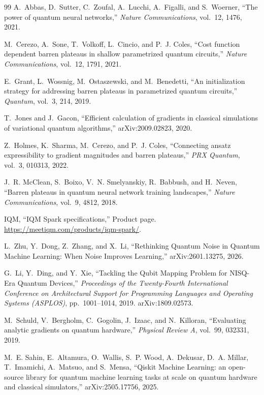 \documentclass[11pt]{article}
\begin{document}
\begin{thebibliography}{99}
A.~Abbas, D.~Sutter, C.~Zoufal, A.~Lucchi, A.~Figalli, and S.~Woerner,
\newblock ``The power of quantum neural networks,''
\newblock \emph{Nature Communications}, vol.~12, 1476, 2021.

M.~Cerezo, A.~Sone, T.~Volkoff, L.~Cincio, and P.~J. Coles,
\newblock ``Cost function dependent barren plateaus in shallow parametrized quantum circuits,''
\newblock \emph{Nature Communications}, vol.~12, 1791, 2021.

E.~Grant, L.~Wossnig, M.~Ostaszewski, and M.~Benedetti,
\newblock ``An initialization strategy for addressing barren plateaus in parametrized quantum circuits,''
\newblock \emph{Quantum}, vol.~3, 214, 2019.

T.~Jones and J.~Gacon,
\newblock ``Efficient calculation of gradients in classical simulations of variational quantum algorithms,''
\newblock arXiv:2009.02823, 2020.

Z.~Holmes, K.~Sharma, M.~Cerezo, and P.~J. Coles,
\newblock ``Connecting ansatz expressibility to gradient magnitudes and barren plateaus,''
\newblock \emph{PRX Quantum}, vol.~3, 010313, 2022.

J.~R. McClean, S.~Boixo, V.~N. Smelyanskiy, R.~Babbush, and H.~Neven,
\newblock ``Barren plateaus in quantum neural network training landscapes,''
\newblock \emph{Nature Communications}, vol.~9, 4812, 2018.

IQM,
\newblock ``IQM Spark specifications,''
\newblock Product page.
\newblock \url{https://meetiqm.com/products/iqm-spark/}.

L.~Zhu, Y.~Dong, Z.~Zhang, and X.~Li,
\newblock ``Rethinking Quantum Noise in Quantum Machine Learning: When Noise Improves Learning,''
\newblock arXiv:2601.13275, 2026.

G.~Li, Y.~Ding, and Y.~Xie,
\newblock ``Tackling the Qubit Mapping Problem for NISQ-Era Quantum Devices,''
\newblock \emph{Proceedings of the Twenty-Fourth International Conference on Architectural Support for Programming Languages and Operating Systems (ASPLOS)}, pp.~1001--1014, 2019.
\newblock arXiv:1809.02573.

M.~Schuld, V.~Bergholm, C.~Gogolin, J.~Izaac, and N.~Killoran,
\newblock ``Evaluating analytic gradients on quantum hardware,''
\newblock \emph{Physical Review A}, vol.~99, 032331, 2019.

M.~E. Sahin, E.~Altamura, O.~Wallis, S.~P. Wood, A.~Dekusar, D.~A. Millar, T.~Imamichi, A.~Matsuo, and S.~Mensa,
\newblock ``Qiskit Machine Learning: an open-source library for quantum machine learning tasks at scale on quantum hardware and classical simulators,''
\newblock arXiv:2505.17756, 2025.


\end{thebibliography}
\end{document}
